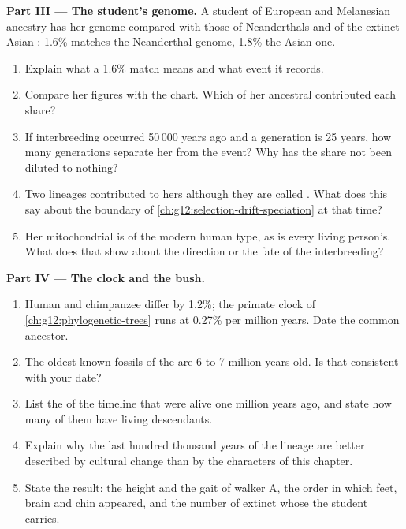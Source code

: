 \begin{problem}
\medskip
\noindent\textbf{Part III --- The student's genome.}
A student of European and Melanesian ancestry has her genome compared
with those of Neanderthals and of the extinct Asian : 1.6\%
matches the Neanderthal genome, 1.8\% the Asian one.
\begin{enumerate}[resume]
  \item Explain what a 1.6\% match means and what event it records.
  \item Compare her figures with the chart. Which of her ancestral
         contributed each share?
  \item If interbreeding occurred 50\,000 years ago and a generation is
        25 years, how many generations separate her from the event?
        Why has the share not been diluted to nothing?
  \item Two lineages contributed  to hers although they are
        called . What does this say about the  boundary
        of \cref{ch:g12:selection-drift-speciation} at that time?
  \item Her mitochondrial  is of the modern human type, as is every
        living person's. What does that show about the direction or
        the fate of the interbreeding?
\end{enumerate}

\medskip
\noindent\textbf{Part IV --- The clock and the bush.}
\begin{enumerate}[resume]
  \item Human and chimpanzee  differ by 1.2\%; the primate clock of
        \cref{ch:g12:phylogenetic-trees} runs at 0.27\% per million
        years. Date the common ancestor.
  \item The oldest known fossils of the  are 6 to 7
        million years old. Is that consistent with your date?
  \item List the  of the timeline that were alive one million
        years ago, and state how many of them have living descendants.
  \item Explain why the last hundred thousand years of the lineage are
        better described by cultural change than by the characters of
        this chapter.
  \item State the result: the height and the gait of walker A, the
        order in which feet, brain and chin appeared, and the number
        of extinct  whose  the student carries.
\end{enumerate}
\end{problem}
